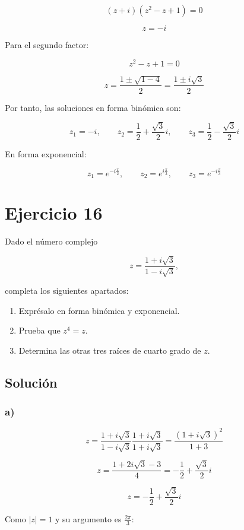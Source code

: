 \documentclass[fleqn]{article}
\begin{document}
		\[
		(z+i)(z^2-z+1)=0
		\]

		\[
		z=-i
		\]

		Para el segundo factor:

		\[
		z^2-z+1=0
		\]

		\[
		z
		=
		\frac{1\pm\sqrt{1-4}}{2}
		=
		\frac{1\pm i\sqrt{3}}{2}
		\]

		Por tanto, las soluciones en forma binómica son:

		\[
		\boxed{
		z_1=-i,
		\qquad
		z_2=\frac{1}{2}+\frac{\sqrt{3}}{2}i,
		\qquad
		z_3=\frac{1}{2}-\frac{\sqrt{3}}{2}i
		}
		\]

		En forma exponencial:

		\[
		\boxed{
		z_1=e^{-i\frac{\pi}{2}},
		\qquad
		z_2=e^{i\frac{\pi}{3}},
		\qquad
		z_3=e^{-i\frac{\pi}{3}}
		}
		\]
	
	\section{Ejercicio 16}
		Dado el número complejo

		\[
		z=\frac{1+i\sqrt{3}}{1-i\sqrt{3}},
		\]

		completa los siguientes apartados:

		\begin{enumerate}[label=\alph*)]
			\item Exprésalo en forma binómica y exponencial.
			\item Prueba que $z^4=z$.
			\item Determina las otras tres raíces de cuarto grado de $z$.
		\end{enumerate}

		\subsection{Solución}

		\subsubsection*{a)}

		\[
		z
		=
		\frac{1+i\sqrt{3}}{1-i\sqrt{3}}
		\frac{1+i\sqrt{3}}{1+i\sqrt{3}}
		=
		\frac{(1+i\sqrt{3})^2}{1+3}
		\]

		\[
		z
		=
		\frac{1+2i\sqrt{3}-3}{4}
		=
		-\frac{1}{2}+\frac{\sqrt{3}}{2}i
		\]

		\[
		\boxed{
		z=-\frac{1}{2}+\frac{\sqrt{3}}{2}i
		}
		\]

		Como $|z|=1$ y su argumento es $\frac{2\pi}{3}$:
\end{document}
